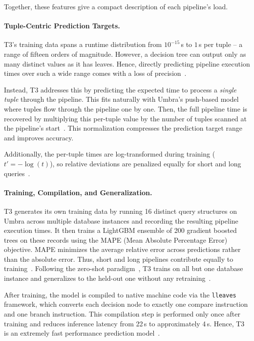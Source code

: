 Together, these features give a compact description of each pipeline's load.

\paragraph{Tuple-Centric Prediction Targets.}
T3's training data spans a runtime distribution from $10^{-15}$\,s to $1$\,s per tuple -- a range of fifteen orders of magnitude.
However, a decision tree can output only as many distinct values as it has leaves.
Hence, directly predicting pipeline execution times over such a wide range comes with a loss of precision~\parencite{t3}.

Instead, T3 addresses this by predicting the expected time to process a \emph{single tuple} through the pipeline.
This fits naturally with Umbra's push-based model where tuples flow through the pipeline one by one.
Then, the full pipeline time is recovered by multiplying this per-tuple value by the number of tuples scanned at the pipeline's start~\parencite{t3}.
This normalization compresses the prediction target range and improves accuracy.

Additionally, the per-tuple times are log-transformed during training ($t' = -\log(t)$), so relative deviations are penalized equally for short and long queries~\parencite{t3}.

\paragraph{Training, Compilation, and Generalization.}
T3 generates its own training data by running 16 distinct query structures on Umbra across multiple database instances and recording the resulting pipeline execution times.
It then trains a LightGBM ensemble of 200 gradient boosted trees on these records using the MAPE (Mean Absolute Percentage Error) objective.
MAPE minimizes the average relative error across predictions rather than the absolute error.
Thus, short and long pipelines contribute equally to training~\parencite{t3}.
Following the zero-shot paradigm~\parencite{zeroshot}, T3 trains on all but one database instance and generalizes to the held-out one without any retraining~\parencite{t3}.

After training, the model is compiled to native machine code via the \texttt{lleaves} framework, which converts each decision node to exactly one compare instruction and one branch instruction.
This compilation step is performed only once after training and reduces inference latency from 22\,\textmu{}s to approximately 4\,\textmu{}s.
Hence, T3 is an extremely fast performance prediction model~\parencite{t3}.

